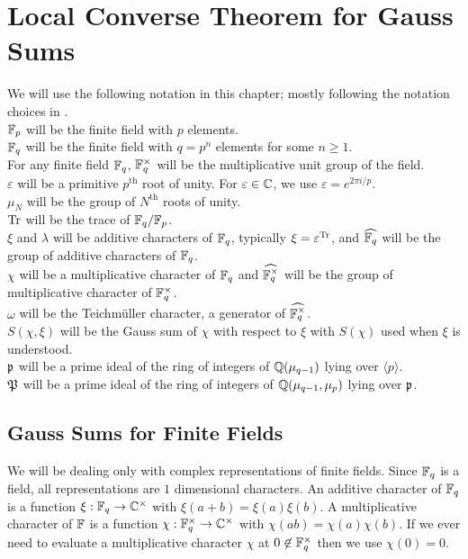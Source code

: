 \chapter{Local Converse Theorem for Gauss Sums}	%

\noindent We will use the following notation in this chapter; mostly following the notation choices in \cite{Lang1990}.\\
$\mathbb{F}_p$ will be the finite field with $p$ elements.\\
$\mathbb{F}_q$ will be the finite field with $q = p^n$ elements for some $n \geq 1$.\\
For any finite field $\mathbb{F}_q$, $\mathbb{F}_q^\times$ will be the multiplicative unit group of the field.\\
$\varepsilon$ will be a primitive $p^\text{th}$ root of unity. For $\varepsilon \in \mathbb{C}$, we use $\varepsilon = e^{2 \pi i /p}$.\\
$\mu_N$ will be the group of $N^\text{th}$ roots of unity.\\
$\textrm{Tr}$ will be the trace of $\mathbb{F}_q/\mathbb{F}_p$.\\
$\xi$ and $\lambda$ will be additive characters of $\mathbb{F}_q$, typically $\xi = \varepsilon^{\textrm{Tr}}$, and $\widehat{\mathbb{F}_q}$ will be the group of additive characters of $\mathbb{F}_q$. \\
$\chi$ will be a multiplicative character of $\mathbb{F}_q$ and $\widehat{\mathbb{F}^\times_q}$ will be the group of multiplicative character of $\mathbb{F}_q^\times$.\\
$\omega$ will be the Teichm\"uller character, a generator of $\widehat{\mathbb{F}^\times_q}$.\\
$S(\chi, \xi)$ will be the Gauss sum of $\chi$ with respect to $\xi$ with $S(\chi)$ used when $\xi$ is understood.\\
$\mathfrak{p}$ will be a prime ideal of the ring of integers of $\mathbb{Q}(\mu_{q-1})$ lying over $\langle p \rangle$.\\
$\mathfrak{P}$ will be a prime ideal of the ring of integers of $\mathbb{Q}(\mu_{q-1}, \mu_p)$ lying over $\mathfrak{p}$.\\
\section{Gauss Sums for Finite Fields}
\label{sec:finite-fields-intro}

We will be dealing only with complex representations of finite fields.
Since $\mathbb{F}_q$ is a field, all representations are $1$ dimensional characters.
An additive character of $\mathbb{F}_q$ is a function $\xi : \mathbb{F}_q \to \mathbb{C}^\times$ with $\xi(a + b) = \xi(a)\xi(b)$.
A multiplicative character of $\mathbb{F}$ is a function $\chi : \mathbb{F}_q^\times \to \mathbb{C}^\times$ with $\chi(ab) = \chi(a)\chi(b)$.
If we ever need to evaluate a multiplicative character $\chi$ at $0 \not \in \mathbb{F}_q^\times$ then we use $\chi(0) = 0$. \\

